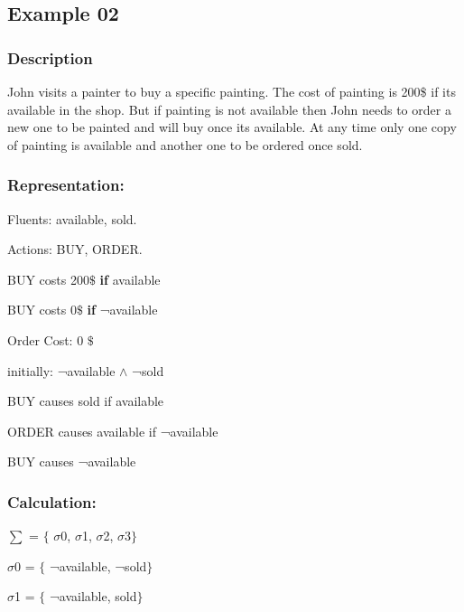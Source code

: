 \documentclass[11pt]{article}
\begin{document}
	\subsection{Example 02}\label{example:ex02}
	\subsubsection{Description}\label{par:p102}
	John visits a painter to buy a specific painting. The cost of painting is 200\$ if its available in the shop. But if painting is not available then John needs to order a new one to be painted and will buy once its available. At any time only one copy of painting is available and another one to be ordered once sold. 
	
	\subsubsection{Representation:}\label{par:p202}
	\indent 
	\par Fluents: available, sold.\par
	Actions: BUY, ORDER.\par
	BUY costs 200$\$$  \textbf{if} available\par
	
	BUY costs 0$\$$  \textbf{if} ¬available\par
	
	
	Order Cost: 0 $\$$
	
	initially: ¬available $\wedge$  ¬sold\par
	
	BUY causes sold if available\par
	
	ORDER causes available if ¬available\par
	
	BUY causes ¬available\\
	
	\subsubsection{Calculation:}\label{par:p302}
	\indent \par
	$ \sum $ = $ \{ $ $ \sigma $0, $ \sigma $1, $ \sigma $2, $ \sigma $3$ \} $ \par
	
	$ \sigma $0 = $ \{ $ ¬available, ¬sold$ \} $ \par
	
	$ \sigma $1 = $ \{ $ ¬available, sold$ \} $ \par
	
\end{document}
